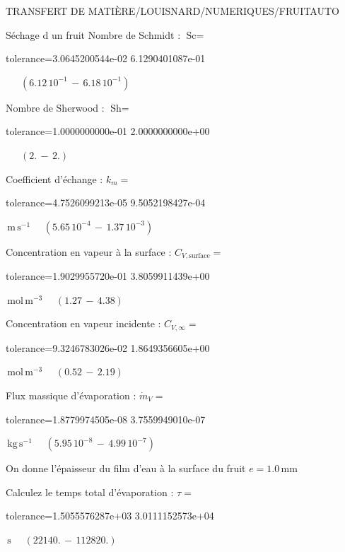 \documentclass[12pt]{article}
\begin{document}
\begin{quiz}{TRANSFERT DE MATIÈRE/LOUISNARD/NUMERIQUES/FRUITAUTO}
\begin{cloze}{Séchage d un fruit}
Nombre de Schmidt : $\text{Sc} =  $
\begin{numerical}[points=1] 
\item[tolerance={3.0645200544e-02}] 6.1290401087e-01 
\end{numerical} 
 $\,$ 
 $ \quad ( 6.12 \, 10^{-1}  \, - \,  6.18 \, 10^{-1} ) $ 

Nombre de Sherwood : $\text{Sh} =  $
\begin{numerical}[points=2] 
\item[tolerance={1.0000000000e-01}] 2.0000000000e+00 
\end{numerical} 
 $\,$ 
 $ \quad (2. \, - \, 2.) $ 

Coefficient d'échange : $k_m =  $
\begin{numerical}[points=1] 
\item[tolerance={4.7526099213e-05}] 9.5052198427e-04 
\end{numerical} 
 $\,  \mathrm{m}\,  \mathrm{s}^{-1}$ 
 $ \quad ( 5.65 \, 10^{-4}  \, - \,  1.37 \, 10^{-3} ) $ 

Concentration en vapeur à la surface : $C_{V, \text{surface}} =  $
\begin{numerical}[points=2] 
\item[tolerance={1.9029955720e-01}] 3.8059911439e+00 
\end{numerical} 
 $\,  \mathrm{mol}\,  \mathrm{m}^{-3}$ 
 $ \quad (1.27 \, - \, 4.38) $ 

Concentration en vapeur incidente : $C_{V, \infty} =  $
\begin{numerical}[points=2] 
\item[tolerance={9.3246783026e-02}] 1.8649356605e+00 
\end{numerical} 
 $\,  \mathrm{mol}\,  \mathrm{m}^{-3}$ 
 $ \quad (0.52 \, - \, 2.19) $ 

Flux massique d'évaporation : $\dot{m}_V =  $
\begin{numerical}[points=1] 
\item[tolerance={1.8779974505e-08}] 3.7559949010e-07 
\end{numerical} 
 $\,  \mathrm{kg}\,  \mathrm{s}^{-1}$ 
 $ \quad ( 5.95 \, 10^{-8}  \, - \,  4.99 \, 10^{-7} ) $ 

 

On donne l'épaisseur du film d'eau à la surface du fruit $e = 1.0\,  \mathrm{mm} $

Calculez le temps total d'évaporation : $\tau =  $
\begin{numerical}[points=2] 
\item[tolerance={1.5055576287e+03}] 3.0111152573e+04 
\end{numerical} 
 $\,  \mathrm{s}$ 
 $ \quad (22140. \, - \, 112820.) $ 


\end{cloze}
\end{quiz}
\end{document}
